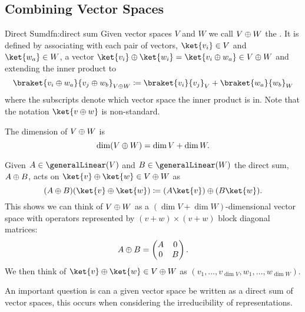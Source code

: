 \subsection{Combining Vector Spaces}
\begin{dfn}{Direct Sum}{dfn:direct sum}
    Given vector spaces \(V\) and \(W\) we call \(V\oplus W\) the .
    It is defined by associating with each pair of vectors, \(\ket{v_i} \in V\) and \(\ket{w_a} \in W\), a vector \(\ket{v_i} \directsum \ket{w_i} = \ket{v_i \directsum w_a} \in V \directsum W\) and extending the inner product to
    \begin{equation}
        \braket{v_i \directsum w_a}{v_j \directsum w_b}_{V\directsum W} \coloneqq \braket{v_i}{v_j}_{V} + \braket{w_a}{w_b}_{W}
    \end{equation}
    where the subscripts denote which vector space the inner product is in.
    Note that the notation \(\ket{v \directsum w}\) is non-standard.
    
    The dimension of \(V \oplus W\) is
    \begin{equation}
        \dim(V \oplus W) = \dim V + \dim W.
    \end{equation}
    
    Given \(A \in \generalLinear(V)\) and \(B \in \generalLinear(W)\) the direct sum, \(A \oplus B\), acts on \(\ket{v} \directsum \ket{w} \in V \directsum W\) as
    \begin{equation}
        (A \directsum B)(\ket{v} \directsum \ket{w}) \coloneqq (A\ket{v}) \directsum (B\ket{w}).
    \end{equation}
    This shows we can think of \(V \oplus W\) as a \((\dim V + \dim W)\)-dimensional vector space with operators represented by \((v + w) \times (v + w)\) block diagonal matrices:
    \begin{equation}
        A \oplus B = 
        \begin{pmatrix}
            A & 0\\
            0 & B
        \end{pmatrix}
        .
    \end{equation}
    We then think of \(\ket{v} \directsum \ket{w} \in V \directsum W\) as \((v_1, \dotsc, v_{\dim V}, w_1, \dotsc, w_{\dim W})\).
\end{dfn}

An important question is can a given vector space be written as a direct sum of vector spaces, this occurs when considering the irreducibility of representations.

